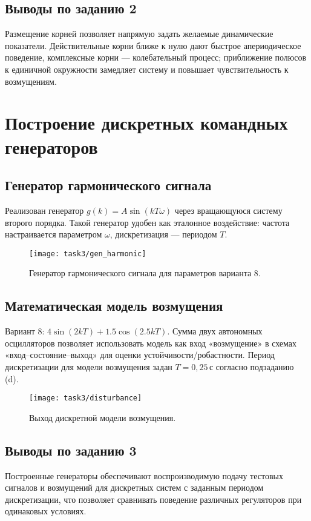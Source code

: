\section*{Выводы по заданию 2}
Размещение корней позволяет напрямую задать желаемые динамические показатели. Действительные корни ближе к нулю дают быстрое апериодическое поведение, комплексные корни — колебательный процесс; приближение полюсов к единичной окружности замедляет систему и повышает чувствительность к возмущениям.

\chapter{Построение дискретных командных генераторов}
\section{Генератор гармонического сигнала}
Реализован генератор \(g(k) = A\sin(kT\omega)\) через вращающуюся систему второго порядка. Такой генератор удобен как эталонное воздействие: частота настраивается параметром \(\omega\), дискретизация — периодом \(T\).
\begin{figure}[H]
  \centering
  \texttt{[image: task3/gen\_harmonic]}
  \caption{Генератор гармонического сигнала для параметров варианта 8.}
\end{figure}

\section{Математическая модель возмущения}
Вариант 8: \(4\sin(2kT) + 1.5\cos(2.5kT)\). Сумма двух автономных осцилляторов позволяет использовать модель как вход «возмущение» в схемах «вход–состояние–выход» для оценки устойчивости/робастности. Период дискретизации для модели возмущения задан \(T=0{,}25\,\text{с}\) согласно подзаданию (d).
\begin{figure}[H]
  \centering
  \texttt{[image: task3/disturbance]}
  \caption{Выход дискретной модели возмущения.}
\end{figure}

\section*{Выводы по заданию 3}
Построенные генераторы обеспечивают воспроизводимую подачу тестовых сигналов и возмущений для дискретных систем с заданным периодом дискретизации, что позволяет сравнивать поведение различных регуляторов при одинаковых условиях.
